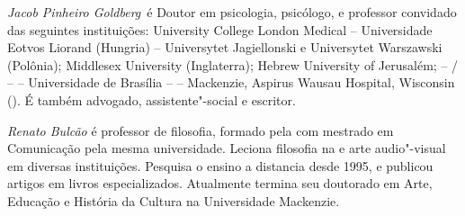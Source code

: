 \emph{Jacob Pinheiro Goldberg}~é Doutor em psicologia, psicólogo, e
professor convidado das seguintes instituições:
University College London Medical -- Universidade Eotvos
Liorand (Hungria) -- Universytet Jagiellonski e Universytet Warszawski
(Polônia); Middlesex University (Inglaterra); Hebrew University of
Jerusalém;  -- / --  -- Universidade de Brasília --  --
Mackenzie, Aspirus Wausau Hospital, Wisconsin (). É também
advogado, assistente"-social e escritor.

\emph{Renato Bulcão} é professor de filosofia, formado pela  com
mestrado em Comunicação pela mesma universidade. Leciona filosofia na
 e arte audio"-visual em diversas instituições. Pesquisa o ensino a
distancia desde 1995, e publicou artigos em livros especializados.
Atualmente termina seu doutorado em Arte, Educação e História da Cultura
na Universidade Mackenzie.

